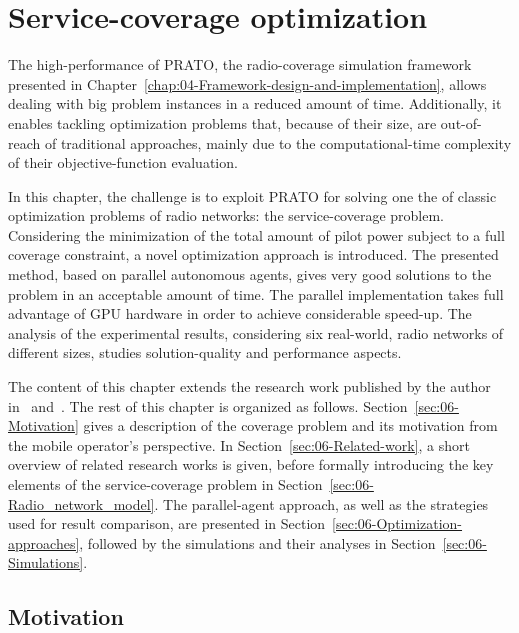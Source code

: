 
\chapter{Service-coverage optimization \label{chap:06-Experimental-evaluation-the-service-coverage-problem}}


\noindent The high-performance of PRATO, the radio-coverage simulation
framework presented in Chapter~\ref{chap:04-Framework-design-and-implementation},
allows dealing with big problem instances in a reduced amount of time.
Additionally, it enables tackling optimization problems that, because
of their size, are out-of-reach of traditional approaches, mainly
due to the computational-time complexity of their objective-function
evaluation.

In this chapter, the challenge is to exploit PRATO for solving one
the of classic optimization problems of radio networks: the service-coverage
problem. Considering the minimization of the total amount of pilot
power subject to a full coverage constraint, a novel optimization
approach is introduced. The presented method, based on parallel autonomous
agents, gives very good solutions to the problem in an acceptable
amount of time. The parallel implementation takes full advantage of
GPU hardware in order to achieve considerable speed-up. The analysis
of the experimental results, considering six real-world, radio networks
of different sizes, studies solution-quality and performance aspects.

The content of this chapter extends the research work published by
the author in~\cite{Benedicic_Pilot.power.optimization:2010} and~\cite{Benedicic-A_GPU_based_parallel_agent_optimization_approach:2013}.
The rest of this chapter is organized as follows. Section~\ref{sec:06-Motivation}
gives a description of the coverage problem and its motivation from
the mobile operator's perspective. In Section~\ref{sec:06-Related-work},
a short overview of related research works is given, before formally
introducing the key elements of the service-coverage problem in Section~\ref{sec:06-Radio_network_model}.
The parallel-agent approach, as well as the strategies used for result
comparison, are presented in Section~\ref{sec:06-Optimization-approaches},
followed by the simulations and their analyses in Section~\ref{sec:06-Simulations}.


\section{Motivation \label{sec:06-Motivation}}

